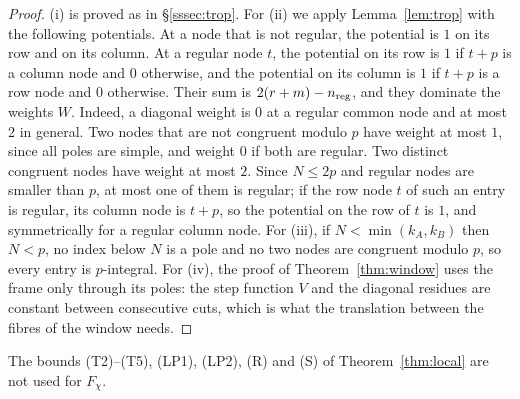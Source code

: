 \begin{proof}
(i) is proved as in \S\ref{sssec:trop}. For (ii) we apply Lemma~\ref{lem:trop} with the following potentials. At a node
that is not regular, the potential is $1$ on its row and on its column. At a regular node $t$, the potential on its row is
$1$ if $t+p$ is a column node and $0$ otherwise, and the potential on its column is $1$ if $t+p$ is a row node and $0$
otherwise. Their sum is $2(r+m)-n_{\rm reg}$, and they dominate the weights $W$. Indeed, a diagonal weight is $0$ at a regular
common node and at most $2$ in general. Two nodes that are not congruent modulo $p$ have weight at most $1$, since all
poles are simple, and weight $0$ if both are regular. Two distinct congruent nodes have weight at most $2$. Since $N\le2p$
and regular nodes are smaller than $p$, at most one of them is regular; if the row node $t$ of such an entry is regular,
its column node is $t+p$, so the potential on the row of $t$ is $1$, and symmetrically for a regular column node. For (iii), if $N<\min(k_A,k_B)$ then $N<p$, no index below $N$ is a
pole and no two nodes are congruent modulo $p$, so every entry is $p$-integral. For (iv), the proof of
Theorem~\ref{thm:window} uses the frame only through its poles: the step function $V$ and the diagonal residues are
constant between consecutive cuts, which is what the translation between the fibres of the window needs.
\end{proof}

The bounds (T2)--(T5), (LP1), (LP2), (R) and (S) of Theorem~\ref{thm:local} are not used for $F_\chi$.

